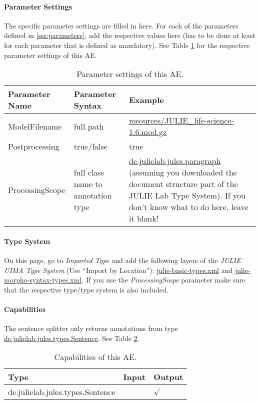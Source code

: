 \documentclass[11pt,a4paper,halfparskip]{scrartcl}
\begin{document}
\paragraph{Parameter Settings}
\label{sss:param_settings}

The specific parameter settings are filled in here. For each of the
parameters defined in \ref{sss:parameters}, add the respective values
here (has to be done at least for each parameter that is defined as
mandatory). See Table \ref{tab:param_settings} for the respective
parameter settings of this AE.

\begin{table}[h!]
  \centering
  \begin{tabular}{|p{4cm}|p{4cm}|p{7cm}|}
    \hline
    Parameter Name & Parameter Syntax & Example \\
    \hline\hline
    ModelFilename & full path & \url{resources/JULIE_life-science-1.6.mod.gz}\\
    \hline
    Postprocessing & true/false & true\\
    \hline 
    ProcessingScope & full class name to annotation type & \url{de.julielab.jules.paragraph} (assuming you downloaded the document structure part of the JULIE Lab Type System). If you don't know what to do here, leave it blank!\\
  \hline
  \end{tabular}
  \caption{Parameter settings of this AE.}
  \label{tab:param_settings}
\end{table}

\paragraph{Type System}
\label{sss:type_system}
On this page, go to \emph{Imported Type} and add the following layers
of the \emph{JULIE UIMA Type System} (Use ``Import by Location''):
\url{julie-basic-types.xml} and
\url{julie-morpho-syntax-types.xml}. If you use the
\textit{ProcessingScope} parameter make sure that the respective
type/type system is also included.


\paragraph{Capabilities}
\label{sss:capabilities}
The sentence splitter only returns annotations from type \url{de.julielab.jules.types.Sentence}. See Table \ref{tab:capabilities}.
\begin{table}[h!]
  \centering
  \begin{tabular}{|p{5cm}|p{2cm}|p{2cm}|}
    \hline
    Type & Input & Output \\
    \hline\hline
     de.julielab.jules.types.Sentence & &  $\surd$  \\
      \hline
  \end{tabular}
  \caption{Capabilities of this AE.}
  \label{tab:capabilities}
\end{table} 
\end{document}
